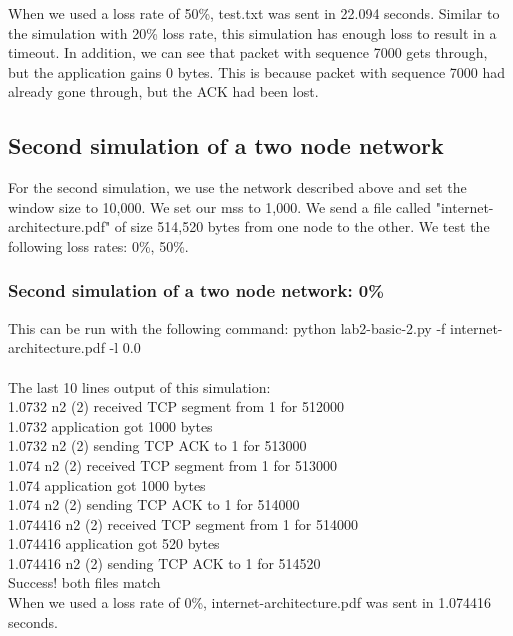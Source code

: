 \documentclass[fleqn,11pt]{article}
\begin{document}
When we used a loss rate of 50\%, test.txt was sent in 22.094 seconds. Similar to the simulation with 20\% loss rate, this simulation has enough loss to result in a timeout. In addition, we can see that packet with sequence 7000 gets through, but the application gains 0 bytes. This is because packet with sequence 7000 had already gone through, but the ACK had been lost. 

 \subsection{Second simulation of a two node network}
For the second simulation, we use the network described above and set the window size to 10,000. We set our mss to 1,000. We send a file called "internet-architecture.pdf" of size 514,520 bytes from one node to the other. We test the following loss rates: 0\%, 50\%.

\subsubsection{Second simulation of a two node network: 0\%}
This can be run with the following command: python lab2-basic-2.py -f internet-architecture.pdf -l 0.0\\\\
The last 10 lines output of this simulation:\\
1.0732 n2 (2) received TCP segment from 1 for 512000\\
1.0732 application got 1000 bytes\\
1.0732 n2 (2) sending TCP ACK to 1 for 513000\\
1.074 n2 (2) received TCP segment from 1 for 513000\\
1.074 application got 1000 bytes\\
1.074 n2 (2) sending TCP ACK to 1 for 514000\\
1.074416 n2 (2) received TCP segment from 1 for 514000\\
1.074416 application got 520 bytes\\
1.074416 n2 (2) sending TCP ACK to 1 for 514520\\
Success! both files match\\

When we used a loss rate of 0\%, internet-architecture.pdf was sent in 1.074416 seconds.
\end{document}
